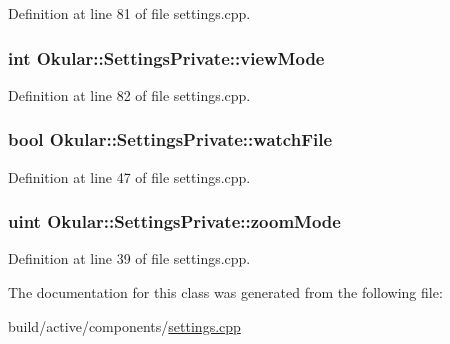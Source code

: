 Definition at line 81 of file settings.\+cpp.

\hypertarget{classOkular_1_1SettingsPrivate_a1676716efb0c771777fbcdfc66800e11}{
\subsubsection[{view\+Mode}]{\setlength{\rightskip}{0pt plus 5cm}int Okular\+::\+Settings\+Private\+::view\+Mode}}\label{classOkular_1_1SettingsPrivate_a1676716efb0c771777fbcdfc66800e11}


Definition at line 82 of file settings.\+cpp.

\hypertarget{classOkular_1_1SettingsPrivate_a4a188b886854f837c336215b519b3bcf}{
\subsubsection[{watch\+File}]{\setlength{\rightskip}{0pt plus 5cm}bool Okular\+::\+Settings\+Private\+::watch\+File}}\label{classOkular_1_1SettingsPrivate_a4a188b886854f837c336215b519b3bcf}


Definition at line 47 of file settings.\+cpp.

\hypertarget{classOkular_1_1SettingsPrivate_a6dcb996680cc0053eb1acf6bb98f05c8}{
\subsubsection[{zoom\+Mode}]{\setlength{\rightskip}{0pt plus 5cm}uint Okular\+::\+Settings\+Private\+::zoom\+Mode}}\label{classOkular_1_1SettingsPrivate_a6dcb996680cc0053eb1acf6bb98f05c8}


Definition at line 39 of file settings.\+cpp.



The documentation for this class was generated from the following file\+:\begin{DoxyCompactItemize}
\item 
build/active/components/\hyperlink{active_2components_2settings_8cpp}{settings.\+cpp}\end{DoxyCompactItemize}
